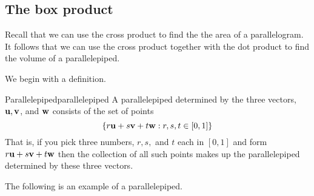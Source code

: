 \subsection{The box product}

Recall that we can use the cross product to find the the area of a parallelogram. It follows that we can use the 
cross product together with the dot product to find the volume of a parallelepiped.

We begin with a definition.

\begin{definition}{Parallelepiped}{parallelepiped}
A parallelepiped
 determined by the three vectors, ${\bf u},{\bf v}$, and ${\bf w}$ consists of the set of points
\begin{equation*}
\left\{r{\bf u}+s{\bf v}+t{\bf w}:r,s,t\in \left[ 0,1\right]
\right\} 
\end{equation*}
That is, if you pick three numbers, $r,s,$ and $t$ each in $\left[ 0,1\right]
$ and form $r{\bf u}+s{\bf v}+t{\bf w}$ then the collection of all
such points makes up the parallelepiped
determined by these three vectors.
\end{definition}

The following is an example of a parallelepiped.

\begin{center}
\end{center}

